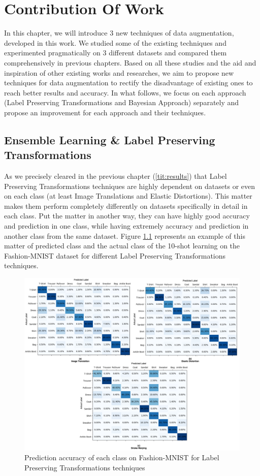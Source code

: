\chapter{Contribution Of Work}
In this chapter, we will introduce $3$ new techniques of data augmentation, developed in this work. We studied some of the existing techniques and experimented pragmatically on $3$ different datasets and compared them comprehensively in previous chapters. Based on all these studies and the aid and inspiration of other existing works and researches, we aim to propose new techniques for data augmentation to rectify the disadvantage of existing ones to reach better results and accuracy. In what follows, we focus on each approach (Label Preserving Transformations and Bayesian Approach) separately and propose an improvement for each approach and their techniques.

\section{Ensemble Learning \& Label Preserving Transformations}
As we precisely cleared in the previous chapter (\ref{tit:results}) that Label Preserving
Transformations techniques are highly dependent on datasets or even on each class (at least Image
Translations and Elastic Distortions). This matter makes them perform completely differently on
datasets specifically in detail in each class. Put the matter in another way, they can have highly
good accuracy and prediction in one class, while having extremely accuracy and prediction in another
class from the same dataset. Figure \ref{fig:Fashion_MNIST_Heatmaps} represents an example of this matter of predicted class
and the actual class of the 10-shot learning on the Fashion-MNIST dataset for different  Label
Preserving Transformations techniques.

\begin{figure}
  \centering
  \label{fig:Fashion_MNIST_Heatmaps}
  \includegraphics[width=1.1\textwidth]{fig/contribution/Fashion_MNIST_Heatmap}
  \caption{Prediction accuracy of each class on Fashion-MNIST for Label Preserving Transformations techniques}
\end{figure}

